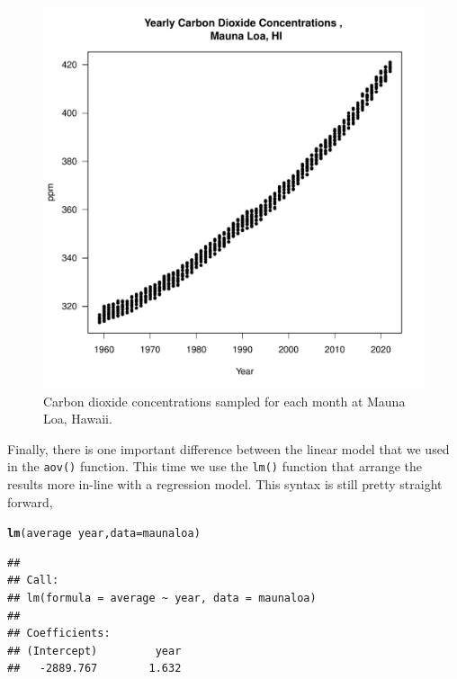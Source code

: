 \documentclass{tufte-handout}\usepackage[]{graphicx}\usepackage[]{color}
\makeatletter
\def\maxwidth{ %
  \ifdim\Gin@nat@width>\linewidth
    \linewidth
  \else
    \Gin@nat@width
  \fi
}
\newcommand{\hlopt}[1]{\textcolor[rgb]{0,0,0}{#1}}%
\newcommand{\hlstd}[1]{\textcolor[rgb]{0.345,0.345,0.345}{#1}}%
\newcommand{\hlkwc}[1]{\textcolor[rgb]{0.333,0.667,0.333}{#1}}%
\newcommand{\hlkwd}[1]{\textcolor[rgb]{0.737,0.353,0.396}{\textbf{#1}}}%
\newenvironment{kframe}{%
 \def\at@end@of@kframe{}%
 \ifinner\ifhmode%
  \def\at@end@of@kframe{\end{minipage}}%
  \begin{minipage}{\columnwidth}%
 \fi\fi%
 \def\FrameCommand##1{\hskip\@totalleftmargin \hskip-\fboxsep
 \colorbox{shadecolor}{##1}\hskip-\fboxsep
     \hskip-\linewidth \hskip-\@totalleftmargin \hskip\columnwidth}%
 \MakeFramed {\advance\hsize-\width
   \@totalleftmargin\z@ \linewidth\hsize
   \@setminipage}}%
 {\par\unskip\endMakeFramed%
 \at@end@of@kframe}
\newenvironment{knitrout}{}{} %
\makeatother
\begin{document}
\begin{figure}
\label{fig:maunaloa}
\caption{Carbon dioxide concentrations sampled for each month at Mauna Loa, Hawaii.}
\begin{knitrout}
\color{fgcolor}
\includegraphics[width=\maxwidth]{figure/unnamed-chunk-52-1} 
\end{knitrout}
\end{figure}


Finally, there is one important difference between the linear model that we used in the \texttt{aov()} function. This time we use the \texttt{lm()} function that arrange the results more in-line with a regression model.
This syntax is still pretty straight forward,  

\begin{knitrout}
\color{fgcolor}\begin{kframe}
\begin{alltt}
\hlkwd{lm}\hlstd{(average} \hlopt{~} \hlstd{year,} \hlkwc{data}\hlstd{=maunaloa)}
\end{alltt}
\begin{verbatim}
## 
## Call:
## lm(formula = average ~ year, data = maunaloa)
## 
## Coefficients:
## (Intercept)         year  
##   -2889.767        1.632
\end{verbatim}
\end{kframe}
\end{knitrout}
\end{document}
